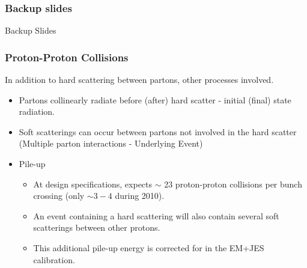 \documentclass[10pt]{beamer}
\begin{document}
\begin{frame}
\frametitle{Backup slides}
Backup Slides
\end{frame}
%
\begin{frame} 
\frametitle{Proton-Proton Collisions}
In addition to hard scattering between partons, other processes involved.
\begin{itemize}
\item Partons collinearly radiate before (after) hard scatter - initial (final) state radiation.
\item Soft scatterings can occur between partons not involved in the hard scatter (Multiple parton interactions - Underlying Event)
\item Pile-up
\begin{itemize}
\item At design specifications, \atlas expects $\sim$ 23 proton-proton collisions per bunch crossing (only $\sim 3-4$ during 2010).
\item An event containing a hard scattering will also contain several soft scatterings between other protons.
\item This additional pile-up energy is corrected for in the EM+JES calibration.
\end{itemize}
\end{itemize}
 

\end{frame}
\end{document}
